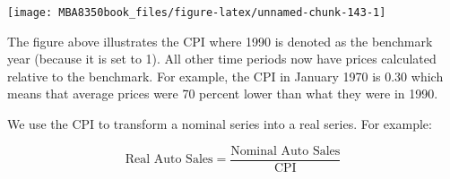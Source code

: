 \documentclass[
]{book}
\newenvironment{Shaded}{\begin{snugshade}}{\end{snugshade}}
\newcommand{\AttributeTok}[1]{\textcolor[rgb]{0.77,0.63,0.00}{#1}}
\newcommand{\ConstantTok}[1]{\textcolor[rgb]{0.00,0.00,0.00}{#1}}
\newcommand{\DecValTok}[1]{\textcolor[rgb]{0.00,0.00,0.81}{#1}}
\newcommand{\FunctionTok}[1]{\textcolor[rgb]{0.00,0.00,0.00}{#1}}
\newcommand{\NormalTok}[1]{#1}
\newcommand{\OtherTok}[1]{\textcolor[rgb]{0.56,0.35,0.01}{#1}}
\newcommand{\SpecialCharTok}[1]{\textcolor[rgb]{0.00,0.00,0.00}{#1}}
\newcommand{\StringTok}[1]{\textcolor[rgb]{0.31,0.60,0.02}{#1}}
\begin{document}
\begin{Shaded}
\end{Shaded}

\begin{center}\texttt{[image: MBA8350book\_files/figure-latex/unnamed-chunk-143-1]} \end{center}

The figure above illustrates the CPI where 1990 is denoted as the benchmark year (because it is set to 1). All other time periods now have prices calculated relative to the benchmark. For example, the CPI in January 1970 is \(0.30\) which means that average prices were 70 percent lower than what they were in 1990.

We use the CPI to transform a nominal series into a real series. For example:

\[\mbox{Real Auto Sales} = \frac{\mbox{Nominal Auto Sales}}{\mbox{CPI}}\]
\end{document}
